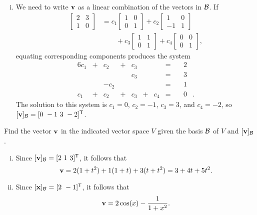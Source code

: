 \begin{example}
\begin{enumerate}[i.]
			
		\item We need to write $\mathbf{v}$ as a linear combination of the vectors in $\mathcal{B}$. If 
\begin{align*}
\left[ \begin{array}{cc} 2&3\\1&0 \end{array} \right] &= c_1\left[ \begin{array}{cc} 1&0\\0&1 \end{array} \right] + c_2 \left[ \begin{array}{rc} 1&0\\-1&1 \end{array} \right] \\
	&\qquad + c_3 \left[ \begin{array}{cc} 1&1\\0&1 \end{array} \right] + c_4 \left[ \begin{array}{cc} 0&0\\0&1 \end{array} \right],
\end{align*}
		equating corresponding components produces the system 
\begin{alignat*}{6}
{}c_1 	&{}+{}	&{}c_2	&{}+{}	&{}c_3	&{}{}		&{}		&{}={}	&\ {}&2&{}\\
{}		&{}{}		&{}		&{}{}		&{}c_3	&{}{}		&{}		&{}={} 	&\ {}&3&{} \\
{}		&{}{}		&{-}c_2	&{}{}		&{}		&{}{}		&{}		&{}={} 	&\ {}&1&{} \\
{}c_1		&{}+{}	&{}c_2	&{}+{}	&{}c_3	&{}+{}	&{}c_4	&{}={}	& \ {}&0&{.}
\end{alignat*}
The solution to this system is $c_1 = 0$, $c_2 = -1$, $c_3 = 3$, and $c_4 = -2$, so $[\vv]_{\CB} = [0 \ -1 \ 3 \ -2]^{\tr}$.

		\end{enumerate}
	
	\item Find the vector $\mathbf{v}$ in the indicated vector space $V$ given the basis $\mathcal{B}$ of $V$ and $[\mathbf{v}]_{\mathcal{B}}$.
		\begin{enumerate}[i.]
		\item Since $[\vv]_{\CB} = [2 \ 1 \ 3]^{\tr}$, it follows that 
		\[\mathbf{v} = 2(1+t^2) + 1(1+t) + 3(t+t^2) = 3+4t+5t^2.\]
		
		\item Since $[\vx]_{\CB} = [2 \ -1]^{\tr}$, it follows that 
		\[\mathbf{v} = 2\cos(x) - \frac{1}{1+x^2}.\]
		
		\end{enumerate}
	
	\ea
	
\end{example}



